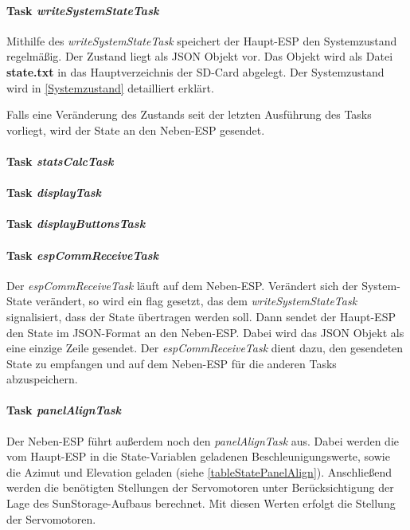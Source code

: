 \paragraph{Task \textit{writeSystemStateTask}}
Mithilfe des \textit{writeSystemStateTask} speichert der Haupt-ESP den Systemzustand regelmäßig.
Der Zustand liegt als JSON Objekt vor.
Das Objekt wird als Datei \textbf{state.txt} in das Hauptverzeichnis der SD-Card abgelegt.
Der Systemzustand wird in \autoref{Systemzustand} detailliert erklärt.

Falls eine Veränderung des Zustands seit der letzten Ausführung des Tasks vorliegt,
wird der State an den Neben-ESP gesendet.

\paragraph{Task \textit{statsCalcTask}}


\paragraph{Task \textit{displayTask}}


\paragraph{Task \textit{displayButtonsTask}}


\paragraph{Task \textit{espCommReceiveTask}}
Der \textit{espCommReceiveTask} läuft auf dem Neben-ESP.
Verändert sich der System-State verändert, so wird ein flag gesetzt, das dem \emph{writeSystemStateTask} signalisiert, dass der State übertragen werden soll. 
Dann sendet der Haupt-ESP den State im JSON-Format an den Neben-ESP.
Dabei wird das JSON Objekt als eine einzige Zeile gesendet.
Der \textit{espCommReceiveTask} dient dazu, den gesendeten State zu empfangen und auf dem Neben-ESP für die anderen Tasks abzuspeichern.

\paragraph{Task \textit{panelAlignTask}}
Der Neben-ESP führt außerdem noch den \textit{panelAlignTask} aus.
Dabei werden die vom Haupt-ESP in die State-Variablen geladenen Beschleunigungswerte, sowie die Azimut und Elevation geladen (siehe \autoref{tableStatePanelAlign}).
Anschließend werden die benötigten Stellungen der Servomotoren unter Berücksichtigung der Lage des SunStorage-Aufbaus berechnet.
Mit diesen Werten erfolgt die Stellung der Servomotoren.

